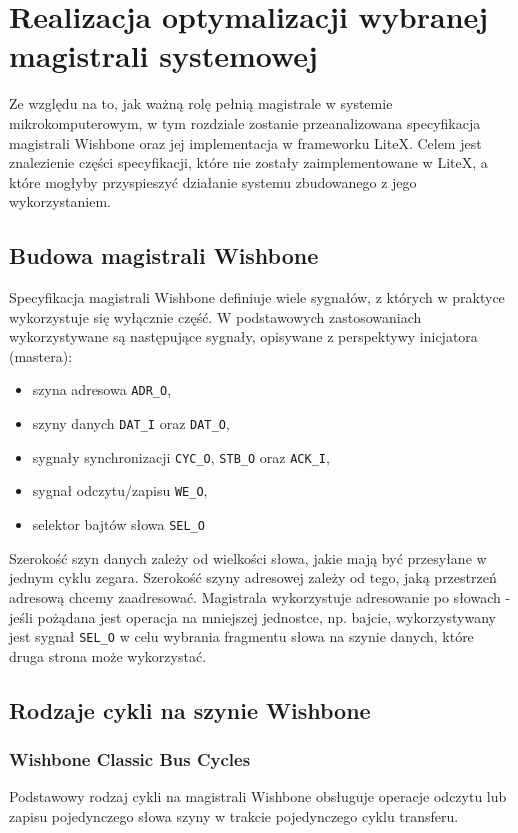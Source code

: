 \section{Realizacja optymalizacji wybranej magistrali systemowej}
Ze względu na to, jak ważną rolę pełnią magistrale w systemie mikrokomputerowym, w tym rozdziale zostanie przeanalizowana specyfikacja magistrali Wishbone oraz jej implementacja w frameworku LiteX. Celem jest znalezienie części specyfikacji, które nie zostały zaimplementowane w LiteX, a które mogłyby przyspieszyć działanie systemu zbudowanego z jego wykorzystaniem.

\subsection{Budowa magistrali Wishbone}
Specyfikacja magistrali Wishbone definiuje wiele sygnałów, z których w praktyce wykorzystuje się wyłącznie część. W podstawowych zastosowaniach wykorzystywane są następujące sygnały, opisywane z perspektywy inicjatora (mastera):
\begin{itemize}
    \item szyna adresowa \texttt{ADR_O},
    \item szyny danych \texttt{DAT_I} oraz \texttt{DAT_O},
    \item sygnały synchronizacji \texttt{CYC_O}, \texttt{STB_O} oraz \texttt{ACK_I},
    \item sygnał odczytu/zapisu \texttt{WE_O},
    \item selektor bajtów słowa \texttt{SEL_O}
\end{itemize}

Szerokość szyn danych zależy od wielkości słowa, jakie mają być przesyłane w jednym cyklu zegara. Szerokość szyny adresowej zależy od tego, jaką przestrzeń adresową chcemy zaadresować. Magistrala wykorzystuje adresowanie po słowach - jeśli pożądana jest operacja na mniejszej jednostce, np. bajcie, wykorzystywany jest sygnał \texttt{SEL_O} w celu wybrania fragmentu słowa na szynie danych, które druga strona może wykorzystać.

\subsection{Rodzaje cykli na szynie Wishbone}

\subsubsection{Wishbone Classic Bus Cycles}
Podstawowy rodzaj cykli na magistrali Wishbone obsługuje operacje odczytu lub zapisu pojedynczego słowa szyny w trakcie pojedynczego cyklu transferu.


